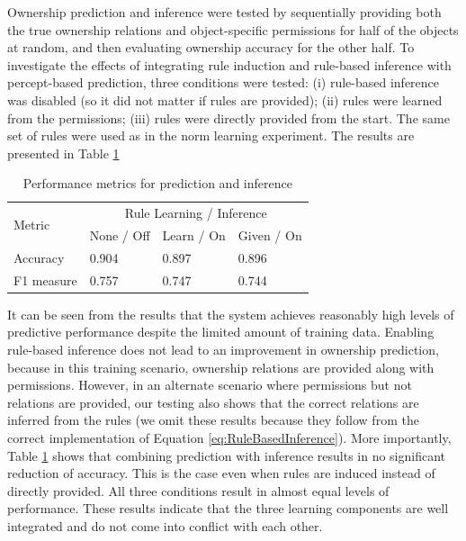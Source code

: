 \documentclass[letterpaper]{article} %
\begin{document}
Ownership prediction and inference were tested by sequentially providing both the true ownership relations and object-specific permissions for half of the objects at random, and then evaluating ownership accuracy for the other half. To investigate the effects of integrating rule induction and rule-based inference with percept-based prediction, three conditions were tested: (i) rule-based inference was disabled (so it did not matter if rules are provided); (ii) rules were learned from the permissions; (iii) rules were directly provided from the start. The same set of rules were used as in the norm learning experiment. The results are presented in Table \ref{tab:OwnershipPrediction}

\begin{table}[ht]
\centering
\begin{tabular}{@{}llll@{}}
\toprule
\multirow{2}{*}{Metric} & \multicolumn{3}{c}{Rule Learning / Inference} \\ \cmidrule(l){2-4}
& None / Off  & Learn / On & Given / On \\ \midrule
Accuracy                & 0.904       & 0.897      & 0.896      \\
F1 measure              & 0.757       & 0.747      & 0.744      \\ \bottomrule
\end{tabular}
\caption{Performance metrics for prediction and inference}
\label{tab:OwnershipPrediction}
\end{table}

It can be seen from the results that the system achieves reasonably high levels of predictive performance despite the limited amount of training data. Enabling rule-based inference does not lead to an improvement in ownership prediction, because in this training scenario, ownership relations are provided along with permissions. However, in an alternate scenario where permissions but not relations are provided, our testing also shows that the correct relations are inferred from the rules (we omit these results because they follow from the correct implementation of Equation \ref{eq:RuleBasedInference}). More importantly, Table \ref{tab:OwnershipPrediction} shows that combining prediction with inference results in no significant reduction of accuracy. This is the case even when rules are induced instead of directly provided. All three conditions result in almost equal levels of performance. These results indicate that the three learning components are well integrated and do not come into conflict with each other.
\end{document}
